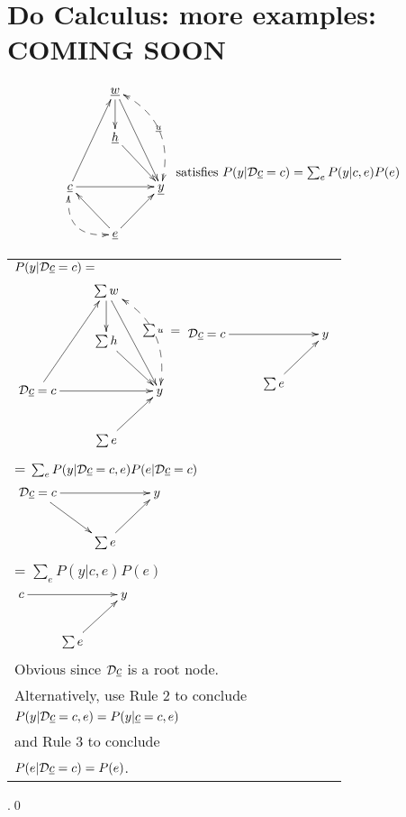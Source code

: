 \chapter{Do Calculus: more examples: COMING SOON}
\label{ch-do-calc-more}
\begin{claim}
$$
\xymatrix{
&\rvw\ar[d]\ar[ddr]\ar@/^1.5pc/@{<-->}[ddr]|\rvu
\\
&\rvh\ar[dr]
\\
\rvc\ar[rr]\ar[uur]\ar@/_1.5pc/@{<-->}[dr]
&&\rvy
\\
&\rve\ar[ru]\ar[lu]
}
\xymatrix{\\ \\
\text{ satisfies }
P(y|\cald \rvc = c)= \sum_e P(y|c,e)P(e)}
$$
\end{claim}
\proof

\begin{longtable}{l}
\color{red}
$P(y|{\cal D}{\underline{c}}=c)=$
\\
$
\xymatrix{
&\sum w\ar[d]\ar[ddr]\ar@/^1.5pc/@{<-->}[ddr]|{\sum u}
\\
&\sum h\ar[dr]
\\
\cald\rvc=c\ar[rr]\ar[uur]
&&y
\\
&\sum e\ar[ru]
}
\xymatrix{
\\
=}
\xymatrix{
\\
\cald\rvc=c\ar[rr]
&&y
\\
&\sum e\ar[ru]
}$
\\
=
\color{red}
$\sum_e
P(y|{\cal D}{\underline{c}}=c, e)
P(e|{\cal D}{\underline{c}}=c)$
\\
$
\xymatrix{
\cald\rvc=c\ar[rr]
\ar[dr]
&&y
\\
&\sum e\ar[ru]
}$
\\
=
\color{red}
$\sum_e
P(y|c, e)
P(e)$
\\
$
\xymatrix{
c\ar[rr]
&&y
\\
&\sum e\ar[ru]
}$
\begin{tabular}{l}\\
Obvious since ${\cal D} {\underline{c}}$ is a root node.\\
Alternatively, use
Rule 2 to  conclude\\ 
$P(y|{\cal D} {\underline{c}}=c,e)=
P(y|{\underline{c}}=c,e)$\\
and Rule  3 to 
conclude\\ 
$P(e|{\cal D} {\underline{c}}=c)=P(e)$.
\end{tabular}
\end{longtable}
.\qed


